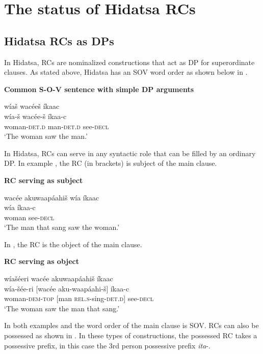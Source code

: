 \documentclass[output=paper]{LSP/langsci}
\begin{document}
\section{The status of Hidatsa RCs}\label{sec:boyle:2}

\subsection{Hidatsa RCs as DPs}\label{sec:boyle:2.1}

In Hidatsa, RCs are nominalized constructions that act as DP for superordinate clauses. As stated above, Hidatsa has an SOV word order as shown below in .

\ea \textbf{Common S-O-V sentence with simple DP arguments} \label{boyle1}

\glll w\'ia\v{s} wac\'ee\v{s} \'ikaac\\
w\'ia-\v{s}  wac\'ee-\v{s} \'ikaa-c\\
woman-\textsc{det.d} man-\textsc{det.d} see-\textsc{decl}\\
\trans`The woman saw the man.' 
\z

In Hidatsa, RCs can serve in any syntactic role that can be filled by an ordinary DP. In example , the RC (in brackets) is subject of the main clause.  

\ea \textbf{RC serving as subject} \label{boyle2}

\glll {\ob}wac\'ee akuwaap\'aahi\v{s}{\cb}  w\'ia \'ikaac\\	
[wac\'ee aku-waap\'aahi-\v{s}] w\'ia  \'ikaa-c\\
[man \textsc{rel.s}-sing-\textsc{det.d}] woman see-\textsc{decl}\\
\trans`The man that sang saw the woman.' 
\z

In , the RC is the object of the main clause.

\ea \textbf{RC serving as object} \label{boyle3}

\glll w\'ia\v{s}\'eeri  {\ob}wac\'ee akuwaap\'aahi\v{s}{\cb}  \'ikaac\\
w\'ia-\v{s}\'ee-ri  [wac\'ee aku-waap\'aahi-\v{s}] \'ikaa-c\\
woman-\textsc{dem-top} [man \textsc{rel.s}-sing-\textsc{det.d}] see-\textsc{decl}\\
\trans `The woman saw the man that sang.' 
\z

In both examples  and  the word order of the main clause is SOV. RCs can also be possessed as shown in . In these types of constructions, the possessed RC takes a possessive prefix, in this case the 3rd person possessive prefix \textit{ita}-.
\end{document}
